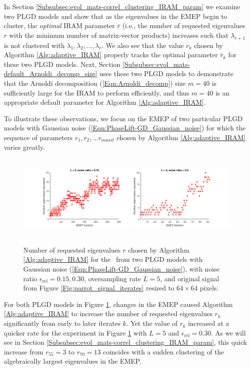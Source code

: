 In Section \ref{Subsubsec:evol_mats-correl_clustering_IRAM_param} we examine two PLGD models and show that as the eigenvalues in the EMEP begin to cluster, the \textit{optimal} IRAM parameter $\bar{r}$ (i.e., the number of requested eigenvalues $r$ with the minimum number of matrix-vector products) increases such that $\lambda_{\bar{r}+1}$ is not clustered with $\lambda_1, \lambda_2, \ldots, \lambda_{\bar{r}}$.
We also see that the value $r_k$ chosen by Algorithm \ref{Alg:adaptive_IRAM} properly tracks the optimal parameter $\bar{r}_k$ for these two PLGD models.
Next, Section \ref{Subsubsec:evol_mats-default_Arnoldi_decomp_size} uses these two PLGD models to demonstrate that the Arnoldi decomposition (\ref{Eqn:Arnoldi_decomp}) size $m=40$ is sufficiently large for the IRAM to perform efficiently, and thus $m=40$ is an appropriate default parameter for Algorithm \ref{Alg:adaptive_IRAM}.





To illustrate these observations, we focus on the EMEP of two particular PLGD models with Gaussian noise (\ref{Eqn:PhaseLift-GD_Gaussian_noise}) for which the sequence of parameters $r_1, r_2, \ldots r_{maxit}$ chosen by Algorithm \ref{Alg:adaptive_IRAM} varies greatly.

\begin{figure}[H]
\centering
\hbox{\hspace{-1.1cm} \includegraphics[scale=0.6]{Numerics-num_eigs_req_ada_2_exps} }\vspace{0.0cm}
	\caption{
Number of requested eigenvalues $r$ chosen by Algorithm \ref{Alg:adaptive_IRAM} for the \emep \ from two PLGD models with Gaussian noise (\ref{Eqn:PhaseLift-GD_Gaussian_noise}), with noise ratio $\epsilon_\text{rel}=0.15, 0.30$, oversampling rate $L=5$, and original signal from Figure \ref{Fig:parrot_signal_iterates} resized to $64 \times 64$ pixels.
}
\label{Fig:Numerics-num_req_eigs_2_exps}
\end{figure}



For both PLGD models in Figure \ref{Fig:Numerics-num_req_eigs_2_exps}, changes in the EMEP caused Algorithm \ref{Alg:adaptive_IRAM} to increase the number of requested eigenvalues $r_k$ significantly from early to later iterates $k$.
Yet the value of $r_k$ increased at a quicker rate for the experiment in Figure \ref{Fig:Numerics-num_req_eigs_2_exps} with $L=5$ and $\epsilon_\text{rel} = 0.30$.
As we will see in Section \ref{Subsubsec:evol_mats-correl_clustering_IRAM_param}, this quick increase from $r_{55}=3$ to $r_{70}=13$ coincides with a sudden clustering of the algebraically largest eigenvalues in the EMEP.





